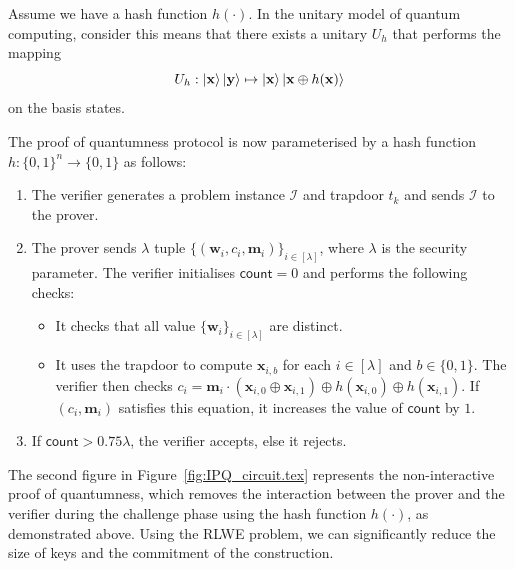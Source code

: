 \documentclass[cryptography,review,submit,pdftex,moreauthors,amsmath,amssymb,aps,strict]{Definitions/mdpi}
\begin{document}
Assume we have a hash function $h(\cdot)$. In the unitary model of quantum computing, consider this means that there exists a unitary $U_h$ that performs the mapping 
$$U_h: \ket{\mathbf{x}}\ket{\mathbf{y}} \mapsto \ket{\mathbf{x}}\ket{\mathbf{x}\oplus h(\mathbf{x})}$$
on the basis states.

The proof of quantumness protocol is now parameterised by a hash function $h:\{0,1\}^n\to\{0,1\}$ as follows:
\begin{enumerate}
    \item The verifier generates a problem instance $\mathcal{I}$ and trapdoor $t_k$ and sends $\mathcal{I}$ to the prover.
    \item The prover sends $\lambda$ tuple $\{(\mathbf{w}_i,c_i,\mathbf{m}_i)\}_{i\in[\lambda]}$, where $\lambda$ is the security parameter. The verifier initialises $\mathsf{count}=0$ and performs the following checks:
    \begin{itemize}
        \item It checks that all value $\{\mathbf{w}_i\}_{i\in[\lambda]}$ are distinct.
        \item It uses the trapdoor to compute $\mathbf{x}_{i,b}$ for each $i\in[\lambda]$ and $b\in\{0,1\}$. The verifier then checks 
        $c_i=\mathbf{m}_i\cdot(\mathbf{x}_{i,0}\oplus\mathbf{x}_{i,1})\oplus h(\mathbf{x}_{i,0})\oplus h(\mathbf{x}_{i,1})$. 
        If $(c_i,\mathbf{m}_i)$
        satisfies this equation, it increases the value of $\mathsf{count}$ by $1$.
    \end{itemize}
    \item If $\mathsf{count}>0.75\lambda$, the verifier accepts, else it rejects.
\end{enumerate}

The second figure in Figure~\ref{fig:IPQ_circuit.tex} represents the non-interactive proof of quantumness, which removes the interaction between the prover and the verifier during the challenge phase using the hash function $h(\cdot)$, as demonstrated above. Using the RLWE problem, we can significantly reduce the size of keys and the commitment of the construction.  
\end{document}
